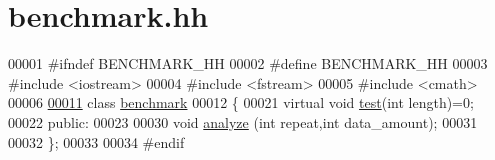 \hypertarget{benchmark_8hh_source}{}\section{benchmark.\+hh}
\label{benchmark_8hh_source}

\begin{DoxyCode}
00001 \textcolor{preprocessor}{#ifndef BENCHMARK\_HH}
00002 \textcolor{preprocessor}{#define BENCHMARK\_HH}
00003 \textcolor{preprocessor}{#include <iostream>}
00004 \textcolor{preprocessor}{#include <fstream>}
00005 \textcolor{preprocessor}{#include <cmath>}
00006 
\hypertarget{benchmark_8hh_source_l00011}{}\hyperlink{classbenchmark}{00011} \textcolor{keyword}{class }\hyperlink{classbenchmark}{benchmark}
00012 \{
00021   \textcolor{keyword}{virtual} \textcolor{keywordtype}{void} \hyperlink{classbenchmark_a698d333f815e6e12c0817b1dfee56e99}{test}(\textcolor{keywordtype}{int} length)=0;
00022 \textcolor{keyword}{public}:
00023   
00030   \textcolor{keywordtype}{void} \hyperlink{classbenchmark_a23e508cd746c10ba8a650965673aa839}{analyze} (\textcolor{keywordtype}{int} repeat,\textcolor{keywordtype}{int} data\_amount); 
00031   
00032 \};
00033 
00034 \textcolor{preprocessor}{#endif}
\end{DoxyCode}

